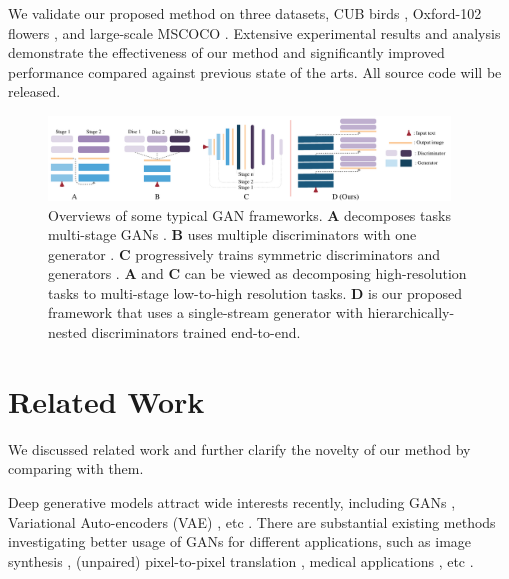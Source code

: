 \documentclass[10pt,twocolumn,letterpaper]{article}
\begin{document}
We validate our proposed method on three datasets, CUB birds \cite{welinder2010caltech}, Oxford-102 flowers \cite{Nilsback08}, and large-scale MSCOCO \cite{lin2014microsoft}. Extensive experimental results and analysis demonstrate the effectiveness of our method and significantly improved performance compared against previous state of the arts. All source code will be released.


\begin{figure}[t]
	\centering
	\includegraphics[width=0.95\textwidth]{figure/views2.pdf}
	\vspace{-.2cm}
	\caption{Overviews of some typical GAN frameworks. \textbf{A} decomposes tasks multi-stage GANs \cite{han2017stackgan,denton2015deep}. \textbf{B} uses multiple discriminators with one generator \cite{durugkar2016generative,tu_etal_nips17_d2gan}. \textbf{C} progressively trains symmetric discriminators and generators \cite{Karras2017progressive,huang2016stacked}. \textbf{A} and \textbf{C} can be viewed as decomposing high-resolution tasks to multi-stage low-to-high resolution tasks.  \textbf{D} is our proposed framework that uses a single-stream generator with hierarchically-nested discriminators trained end-to-end.} \label{fig:archs-review}
\end{figure}


\section{Related Work}
We discussed related work and further clarify the novelty of our method by comparing with them.

Deep generative models attract wide interests recently, including GANs \cite{goodfellow2014generative}, Variational Auto-encoders (VAE) \cite{kingma2013auto}, etc \cite{oord2016pixel}. 
There are substantial existing methods investigating better usage of GANs for different applications, such as image synthesis \cite{radford2015unsupervised, shrivastava2016learning}, (unpaired) pixel-to-pixel translation \cite{isola2016image,zhu2017unpaired}, medical applications \cite{costa2017towards}, etc \cite{ledig2016photo,huang2016stacked}.
\end{document}
